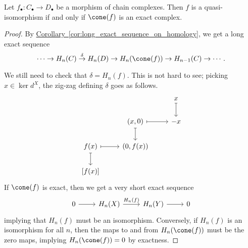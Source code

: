 \documentclass[main.tex]{subfiles}
\begin{document}
\begin{corollary}
  \label{cor:cone_controls_quasi_isomorphism}
  Let $f_{\bullet}\colon C_{\bullet} \to D_{\bullet}$ be a morphism of chain complexes. Then $f$ is a quasi-isomorphism if and only if $\cone(f)$ is an exact complex.
\end{corollary}
\begin{proof}
  By \hyperref[cor:long_exact_sequence_on_homology]{Corollary~\ref*{cor:long_exact_sequence_on_homology}}, we get a long exact sequence
  \begin{equation*}
    \cdots \to  H_{n}(C) \overset{\delta}{\to} H_{n}(D) \to H_{n}(\cone(f)) \to H_{n-1}(C) \to \cdots.
  \end{equation*}

  We still need to check that $\delta = H_{n}(f)$. This is not hard to see; picking $x \in \ker d^{X}$, the zig-zag defining $\delta$ goes as follows.
  \begin{equation*}
    \begin{tikzcd}
      && x
      \arrow[d, mapsto]
      \\
      & (x, 0)
      \arrow[r, mapsto]
      \arrow[d, mapsto]
      & -x
      \\
      f(x)
      \arrow[r, mapsto]
      \arrow[d, mapsto]
      & (0, f(x))
      \\
      {[f(x)]}
    \end{tikzcd}
  \end{equation*}
  If $\cone(f)$ is exact, then we get a very short exact sequence
  \begin{equation*}
    \begin{tikzcd}
      0
      \arrow[r]
      & H_{n}(X)
      \arrow[r, "H_{n}(f)"]
      & H_{n}(Y)
      \arrow[r]
      & 0
    \end{tikzcd}
  \end{equation*}
  implying that $H_{n}(f)$ must be an isomorphism. Conversely, if $H_{n}(f)$ is an isomorphism for all $n$, then the maps to and from $H_{n}(\cone(f))$ must be the zero maps, implying $H_{n}(\cone(f)) = 0$ by exactness.
\end{proof}
\end{document}
